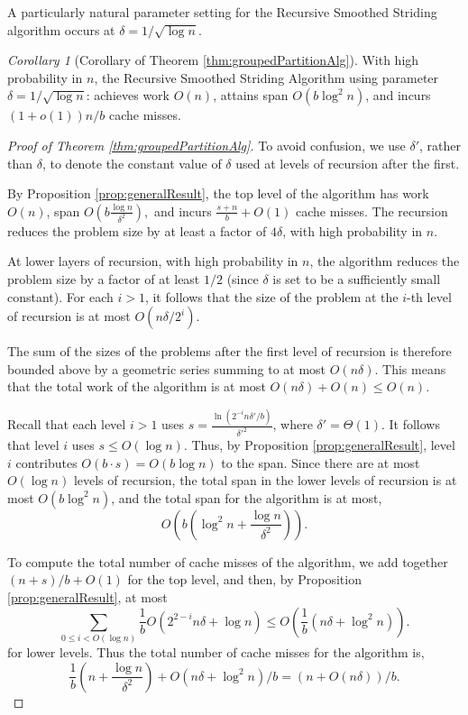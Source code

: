 \documentclass[11pt]{article}
\theoremstyle{remark}
\newtheorem{corollary}[thm]{Corollary}
\theoremstyle{remark}
\begin{document}
A particularly natural parameter setting for the Recursive
Smoothed Striding algorithm occurs at $\delta = 1 / \sqrt{\log n}$.
\begin{corollary}[Corollary of Theorem \ref{thm:groupedPartitionAlg}]
  \label{cor:groupedPartitionAlg} With high probability in $n$,
  the Recursive Smoothed Striding Algorithm using parameter
  $\delta=1/\sqrt{\log n}$: achieves work $O(n)$, attains span
  $O(b\log^2 n)$, and incurs $(1 + o(1))n/b$ cache misses. 
\end{corollary}

\begin{proof}[Proof of Theorem \ref{thm:groupedPartitionAlg}]
  To avoid confusion, we use $\delta'$, rather than $\delta$, to
  denote the constant value of $\delta$ used at levels of recursion
  after the first.
  
  
  By Proposition \ref{prop:generalResult}, the top level of the algorithm
  has work $O(n)$, span $O\left(b\frac{\log n}{\delta^2}\right),$ and
  incurs $\frac{s+n}{b} + O(1)$ cache misses.  The recursion reduces
  the problem size by at least a factor of $4\delta$, with high
  probability in $n$.

  At lower layers of recursion, with high probability in $n$, the
  algorithm reduces the problem size by a factor of at least
  $1/2$ (since $\delta$ is set to be a sufficiently small
  constant). For each $i > 1$, it follows that the size of the
  problem at the $i$-th level of recursion is at most $O(n \delta
  / 2^i)$.
  
  The sum of the sizes of the problems after the first level of
  recursion is therefore bounded above by a geometric series summing to at most $O(n
  \delta)$. This means that the total work of the algorithm is at most
  $O(n\delta) + O(n) \le O(n)$.

  Recall that each level $i > 1$ uses $s =
  \frac{\ln(2^{-i}n\delta'/b)}{\delta'^2}$, where $\delta' =
  \Theta(1)$. It follows that level $i$ uses $s \le O(\log n)$.
  Thus, by Proposition \ref{prop:generalResult}, level $i$
  contributes $O(b\cdot s)=O(b \log n)$ to the span.  Since there
  are at most  $O(\log n)$ levels of recursion, the total span in
  the lower levels of recursion is at most $O(b\log^2 n)$, and
  the total span for the algorithm is at most,
  $$O\left(b\left(\log^2 n + \frac{\log
  n}{\delta^2}\right)\right).$$
        
  To compute the total number of cache misses of the algorithm,
  we add together $(n+s)/b+O(1)$ for the top level, and then, by
  Proposition \ref{prop:generalResult}, at most $$\sum_{0 \leq i<
    O(\log n)}\frac{1}{b} O\left(2^{2-i}n\delta + \log n\right) \le
  O\left(\frac{1}{b} (n \delta + \log^2 n)\right).$$ for lower
  levels. Thus the total number of cache misses for the algorithm
  is, $$\frac{1}{b}\left(n+\frac{\log n}{\delta^2 }\right) +
  O(n\delta + \log^2 n) / b = (n+O(n\delta))/b.$$ 
\end{proof}
\end{document}
